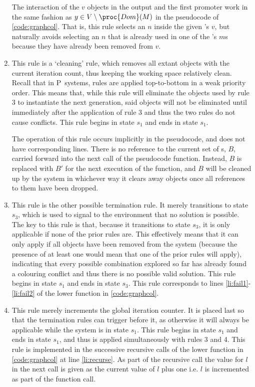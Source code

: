 \begin{enumerate}
The interaction of the \(v\) objects in the output and the first promoter work in the same fashion as \(y \in V \setminus \proc{Dom}(M)\) in the pseudocode of \autoref{code:graphcol}.  That is, this rule selects an \(n\) inside the given \bo{}'s \(v\), but naturally avoids selecting an \(n\) that is already used in one of the \bo{}'s \(m\)s because they have already been removed from \(v\).

\item This rule is a `cleaning' rule, which removes all extant \bo{} objects with the current iteration count, thus keeping the working space relatively clean.  Recall that in P~systems, rules are applied top-to-bottom in a  weak priority order.  This means that, while this rule will eliminate the \bo{} objects used by rule 3 to instantiate the next generation, said objects will not be eliminated until immediately after the application of rule 3 and thus the two rules do not cause conflicts.  This rule begins in state \(s_1\) and ends in state \(s_1\).

The operation of this rule occurs implicitly in the pseudocode, and does not have corresponding lines.  There is no reference to the current set of \bo{}s, \(B\), carried forward into the next call of the pseudocode function.  Instead, \(B\) is replaced with \(B'\) for the next execution of the function, and \(B\) will be cleaned up by the system in whichever way it clears away objects once all references to them have been dropped.

\item This rule is the other possible termination rule.  It merely transitions to state \(s_3\), which is used to signal to the environment that no solution is possible.  The key to this rule is that, because it transitions to state \(s_3\), it is only applicable if none of the prior rules are.  This effectively means that it can only apply if all \bo{} objects have been removed from the system (because the presence of at least one \bo{} would mean that one of the prior rules will apply), indicating that every possible combination explored so far has already found a colouring conflict and thus there is no possible valid solution.  This rule begins in state \(s_1\) and ends in state \(s_3\).  This rule corresponds to lines \ref{li:fail1}-\ref{li:fail2} of the lower  function in \autoref{code:graphcol}.

\item This rule merely increments the global iteration counter.  It is placed last so that the termination rules can trigger before it, as otherwise it will always be applicable while the system is in state \(s_1\).  This rule begins in state \(s_1\) and ends in state \(s_1\), and thus is applied simultaneously with rules 3 and 4.  This rule is implemented in the successive recursive calls of the lower  function in \autoref{code:graphcol} at line \ref{li:recurse}.  As part of the recursive call the value for \(l\) in the next call is given as the current value of \(l\) plus one i.e. \(l\) is incremented as part of the function call.
\end{enumerate}

